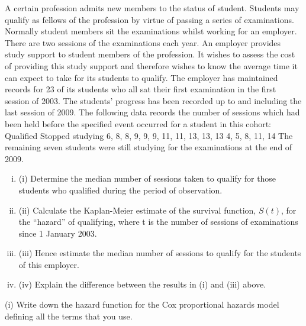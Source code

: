 \documentclass[a4paper,12pt]{article}
\begin{document}
\begin{enumerate}
A certain profession admits new members to the status of student. Students may qualify as fellows of the profession by virtue of passing a series of examinations.
Normally student members sit the examinations whilst working for an employer. There are two sessions of the examinations each year.
An employer provides study support to student members of the profession. It wishes to assess the cost of providing this study support and therefore wishes to know the average time it can expect to take for its students to qualify.
The employer has maintained records for 23 of its students who all sat their first examination in the first session of 2003. The students’ progress has been recorded up to and including the last session of 2009. The following data records the number of sessions which had been held before the specified event occurred for a student in this
cohort:
Qualified
Stopped studying
6, 8, 8, 9, 9, 9, 11, 11, 13, 13, 13
4, 5, 8, 11, 14
The remaining seven students were still studying for the examinations at the end of 2009.
\begin{enumerate}[(i)]
\item (i) Determine the median number of sessions taken to qualify for those students who qualified during the period of observation.
\item  
(ii) Calculate the Kaplan-Meier estimate of the survival function, $S(t)$, for the “hazard” of qualifying, where t is the number of sessions of examinations
since 1 January 2003.
\item  
(iii) Hence estimate the median number of sessions to qualify for the students of this employer.
\item  
(iv) Explain the difference between the results in (i) and (iii) above.
\end{enumerate}
(i)
Write down the hazard function for the Cox proportional hazards model defining all the terms that you use.
 

\end{enumerate}
\end{document}
